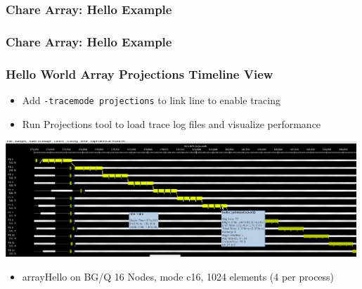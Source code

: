 \begin{frame}[fragile]
  \frametitle{Chare Array: Hello Example }
  
\end{frame}

\begin{frame}[fragile]
  \frametitle{Chare Array: Hello Example }
  
\end{frame}

\begin{frame}[fragile]
   \frametitle{Hello World Array Projections Timeline View}\scriptsize
  \begin{itemize}
    \item Add \texttt{-tracemode projections} to link line to enable tracing
    \item Run Projections tool to load trace log files and visualize performance
  \end{itemize}
  \begin{center} \includegraphics[width=0.99\textwidth]{figures/arrayHelloTimeline} \end{center}
  \begin{itemize}
   \item arrayHello on BG/Q 16 Nodes, mode c16, 1024 elements (4 per process)
  \end{itemize}
\end{frame}


